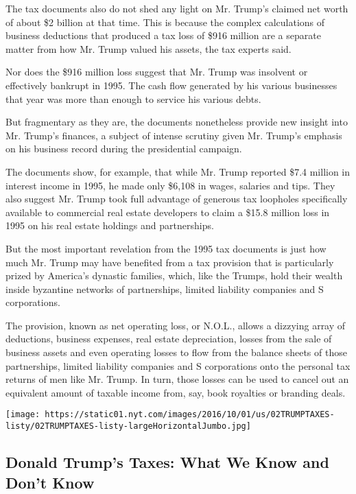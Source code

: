 The tax documents also do not shed any light on Mr. Trump's claimed net
worth of about \$2 billion at that time. This is because the complex
calculations of business deductions that produced a tax loss of \$916
million are a separate matter from how Mr. Trump valued his assets, the
tax experts said.

Nor does the \$916 million loss suggest that Mr. Trump was insolvent or
effectively bankrupt in 1995. The cash flow generated by his various
businesses that year was more than enough to service his various debts.

But fragmentary as they are, the documents nonetheless provide new
insight into Mr. Trump's finances, a subject of intense scrutiny given
Mr. Trump's emphasis on his business record during the presidential
campaign.

The documents show, for example, that while Mr. Trump reported \$7.4
million in interest income in 1995, he made only \$6,108 in wages,
salaries and tips. They also suggest Mr. Trump took full advantage of
generous tax loopholes specifically available to commercial real estate
developers to claim a \$15.8 million loss in 1995 on his real estate
holdings and partnerships.

But the most important revelation from the 1995 tax documents is just
how much Mr. Trump may have benefited from a tax provision that is
particularly prized by America's dynastic families, which, like the
Trumps, hold their wealth inside byzantine networks of partnerships,
limited liability companies and S corporations.

The provision, known as net operating loss, or N.O.L., allows a dizzying
array of deductions, business expenses, real estate depreciation, losses
from the sale of business assets and even operating losses to flow from
the balance sheets of those partnerships, limited liability companies
and S corporations onto the personal tax returns of men like Mr. Trump.
In turn, those losses can be used to cancel out an equivalent amount of
taxable income from, say, book royalties or branding deals.

\href{https://www.nytimes.com/interactive/2016/us/politics/donald-trump-taxes-explained.html}{}

\texttt{[image: https://static01.nyt.com/images/2016/10/01/us/02TRUMPTAXES-listy/02TRUMPTAXES-listy-largeHorizontalJumbo.jpg]}

\hypertarget{donald-trumps-taxes-what-we-know-and-dont-know}{%
\subsection{Donald Trump's Taxes: What We Know and Don't
Know}\label{donald-trumps-taxes-what-we-know-and-dont-know}}

